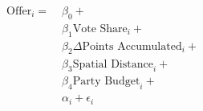 \begin{equation}\label{eq:ols}
\begin{aligned}
\text{Offer}_{i} = \; & \beta_{0} + \\
                & \beta_{1}\text{Vote Share}_{i} + \\
                & \beta_{2}\Delta\text{Points Accumulated}_{i} + \\
                & \beta_{3}\text{Spatial Distance}_{i} + \\
                & \beta_{4}\text{Party Budget}_{i} + \\
                & \alpha_{i} + \epsilon_{i}
\end{aligned}
\end{equation}
